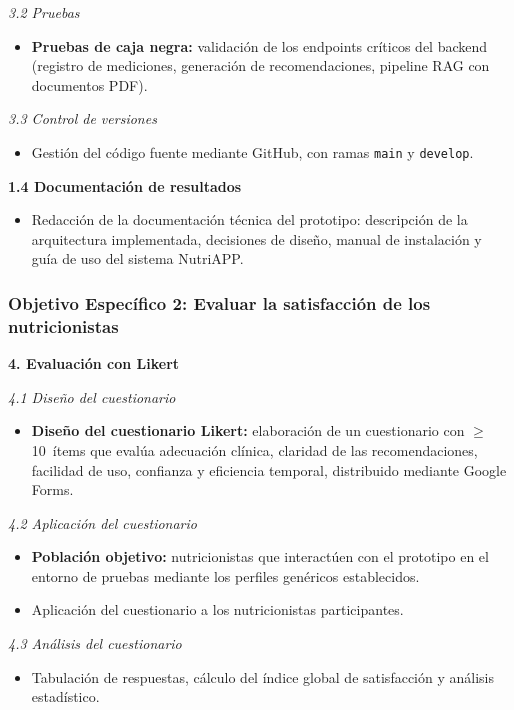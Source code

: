 \textit{3.2 Pruebas}
\begin{itemize}
  \item \textbf{Pruebas de caja negra:} validación de los endpoints críticos del backend (registro de mediciones, generación de recomendaciones, pipeline RAG con documentos PDF).
\end{itemize}

\textit{3.3 Control de versiones}
\begin{itemize}
  \item Gestión del código fuente mediante GitHub, con ramas \texttt{main} y
  \texttt{develop}.
\end{itemize}

\textbf{1.4 Documentación de resultados}
\begin{itemize}
  \item Redacción de la documentación técnica del prototipo: descripción de la arquitectura implementada, decisiones de diseño, manual de instalación y guía de uso del sistema NutriAPP.
\end{itemize}

\subsubsection*{Objetivo Específico 2: Evaluar la satisfacción de los nutricionistas}

\textbf{4. Evaluación con Likert}

\textit{4.1 Diseño del cuestionario}
\begin{itemize}
  \item \textbf{Diseño del cuestionario Likert:} elaboración de un cuestionario con $\geq$10~ítems que evalúa adecuación clínica, claridad de las recomendaciones, facilidad de uso, confianza y eficiencia temporal, distribuido mediante Google Forms.
\end{itemize}

\textit{4.2 Aplicación del cuestionario}
\begin{itemize}
  \item \textbf{Población objetivo:} nutricionistas que interactúen con el prototipo en el entorno de pruebas mediante los perfiles genéricos establecidos.
  \item Aplicación del cuestionario a los nutricionistas participantes.
\end{itemize}

\textit{4.3 Análisis del cuestionario}
\begin{itemize}
  \item Tabulación de respuestas, cálculo del índice global de satisfacción y análisis estadístico.
\end{itemize}

